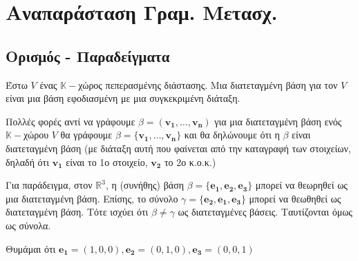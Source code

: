 



\pagestyle{vangelis}








\chapter{Αναπαράσταση Γραμ. Μετασχ.}

\section{Ορισμός - Παραδείγματα}

\begin{dfn}
  Έστω  $V$  ένας  $ \mathbb{K}- $χώρος πεπερασμένης διάστασης. Μια
  \textcolor{Col1}{διατεταγμένη βάση} για τον $V$ είναι μια βάση εφοδιασμένη με μια 
  συγκεκριμένη διάταξη.
\end{dfn}

\begin{rem}
  Πολλές φορές αντί να γράφουμε $ \beta = (\mathbf{v_{1}}, \ldots, \mathbf{v_{n}}) $ για 
  μια διατεταγμένη βάση ενός $ \mathbb{K}- $χώρου $V$ θα γράφουμε 
  $ \beta = \{ \mathbf{v_{1}}, \ldots, \mathbf{v_{n}} \} $ και θα δηλώνουμε ότι η 
  $ \beta $ είναι διατεταγμένη βάση (με διάταξη αυτή που φαίνεται από την καταγραφή 
  των στοιχείων, δηλαδή ότι $ \mathbf{v_{1}} $ είναι το 1ο στοιχείο, 
  $ \mathbf{v_{2}} $ το 2ο κ.ο.κ.) 
\end{rem}


\begin{example}
Για παράδειγμα, στον $ \mathbb{R}^{3} $, η (συνήθης) βάση $ \beta = \{ \mathbf{e_{1}}, 
\mathbf{e_{2}},\mathbf{e_{3}}\} $ μπορεί να θεωρηθεί ως μια διατεταγμένη βάση. 
Επίσης, το σύνολο $ \gamma = \{ \mathbf{e_{2}}, \mathbf{e_{1}}, \mathbf{e_{3}} \} $ 
μπορεί να θεωθηθεί ως διατεταγμένη βάση. 
Τότε ισχύει ότι $ \beta \neq \gamma $ ως διατεταγμένες βάσεις. 
Ταυτίζονται όμως ως σύνολα.  
\end{example}

\begin{rem}
  Θυμάμαι ότι $ \mathbf{e_{1}} = (1,0,0), \mathbf{e_{2}}=(0,1,0), 
  \mathbf{e_{3}}=(0,0,1) $ 
\end{rem}

